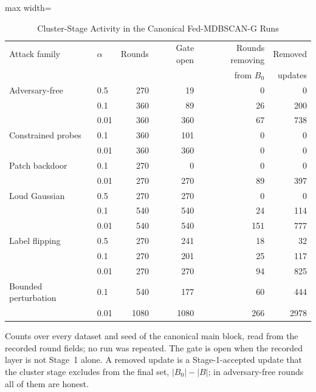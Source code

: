 \begin{table}[!t]
\centering\footnotesize
\setlength{\tabcolsep}{4pt}
\caption{Cluster-Stage Activity in the Canonical Fed-MDBSCAN-G Runs}\label{tab:review_e0}
\begin{adjustbox}{max width=\columnwidth}
\begin{tabular}{llrrrr}
\toprule
Attack family & $\alpha$ & Rounds & Gate open & Rounds removing & Removed \\
 &  &  &  & from $B_0$ & updates \\
\midrule
Adversary-free & 0.5 & 270 & 19 & 0 & 0 \\
 & 0.1 & 360 & 89 & 26 & 200 \\
 & 0.01 & 360 & 360 & 67 & 738 \\
\midrule
Constrained probes & 0.1 & 360 & 101 & 0 & 0 \\
 & 0.01 & 360 & 360 & 0 & 0 \\
\midrule
Patch backdoor & 0.1 & 270 & 0 & 0 & 0 \\
 & 0.01 & 270 & 270 & 89 & 397 \\
\midrule
Loud Gaussian & 0.5 & 270 & 270 & 0 & 0 \\
 & 0.1 & 540 & 540 & 24 & 114 \\
 & 0.01 & 540 & 540 & 151 & 777 \\
\midrule
Label flipping & 0.5 & 270 & 241 & 18 & 32 \\
 & 0.1 & 270 & 201 & 25 & 117 \\
 & 0.01 & 270 & 270 & 94 & 825 \\
\midrule
Bounded perturbation & 0.1 & 540 & 177 & 60 & 444 \\
 & 0.01 & 1080 & 1080 & 266 & 2978 \\
\bottomrule
\end{tabular}
\end{adjustbox}

\par\vspace{3pt}\parbox{\linewidth}{\footnotesize Counts over every dataset and seed of the canonical main block, read from the recorded round fields; no run was repeated. The gate is open when the recorded layer is not Stage~1 alone. A removed update is a Stage-1-accepted update that the cluster stage excludes from the final set, $|B_0|-|B|$; in adversary-free rounds all of them are honest.}
\end{table}
